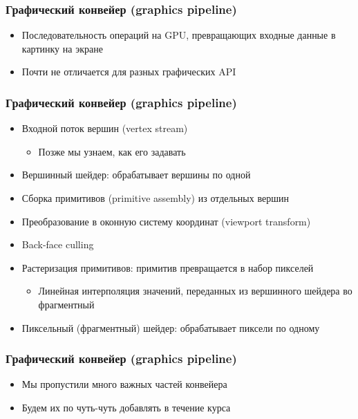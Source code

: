\documentclass[10pt]{beamer}
\begin{document}
\begin{frame}[fragile]
\frametitle{Графический конвейер (graphics pipeline)}
\begin{itemize}
\item Последовательность операций на GPU, превращающих входные данные в картинку на экране
\pause
\item Почти не отличается для разных графических API
\end{itemize}
\end{frame}

\begin{frame}[fragile]
\frametitle{Графический конвейер (graphics pipeline)}
\begin{itemize}
\pause
\item Входной поток вершин (vertex stream)
\begin{itemize}
\item Позже мы узнаем, как его задавать
\end{itemize}
\pause
\item Вершинный шейдер: обрабатывает вершины по одной
\pause
\item Сборка примитивов (primitive assembly) из отдельных вершин
\pause
\item Преобразование в оконную систему координат (viewport transform)
\pause
\item Back-face culling
\pause
\item Растеризация примитивов: примитив превращается в набор пикселей
\begin{itemize}
\item Линейная интерполяция значений, переданных из вершинного шейдера во фрагментный
\end{itemize}
\pause
\item Пиксельный (фрагментный) шейдер: обрабатывает пиксели по одному
\end{itemize}
\end{frame}

\begin{frame}[fragile]
\frametitle{Графический конвейер (graphics pipeline)}
\begin{itemize}
\item Мы пропустили много важных частей конвейера
\item Будем их по чуть-чуть добавлять в течение курса
\end{itemize}
\end{frame}
\end{document}
